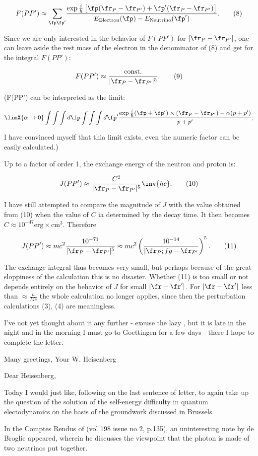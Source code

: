 \documentclass{article}
\newcommand{\nequ}[2]{
\begin{align*}
#1
\tag{#2}
\end{align*}
}
\newcommand{\uequ}[1]{
\begin{align*}
#1
\end{align*}
}
\newcommand{\sumX}[1]{\underset{#1}{\sum}}
\begin{document}
\nequ{
F(P P') \approx \sumX{\fp \fp'}\frac
{
  \exp{
    \frac{i}{\hbar}
    \left[
      \fp(\fr_P - \fr_{P'}) + \fp'(\fr_P - \fr_{P'})
    \right]
  }
}
{
  E_\text{Electron}(\fp) - E_\text{Neutrino}(\fp')
}.
}{8}
Since we are only interested in the behavior of $F(PP')$ for $|\fr_P - \fr_{P'}|$, one can leave aside the rest mass of the electron in the denominator of (8) and get for the integral $F(PP')$:
\nequ{
F(PP') \approx \frac{\text{const.}}{|\fr_P - \fr_{P'}|^5}.
}{9}
(F(PP') can be interpreted as the limit:
\uequ{
\limX{\alpha\to 0}\int\int\int{d\fp}\int\int\int{d\fp'}\frac{
\exp{\frac{i}{\hbar}(\fp + \fp')\times(\fr_P - \fr_{P'}) - \alpha(p + p')}
}{p + p'};
}
I have convinced myself that thia limit exists, even the numeric factor can be easily calculated.)

Up to a factor of order 1, the exchange energy of the neutron and proton is:
\nequ{
J(PP') \approx \frac{C^2}{|\fr_P - \fr_{P'}|^5}\inv{hc}.
}{10}
I have still attempted to compare the magnitude of $J$ with the value obtained from (10) when the value of $C$ ia determined by the decay time. It then becomes $C \approx 10^{-47}\text{erg}\times\text{cm}^3$. Therefore
\nequ{
J(PP') \approx mc^2 \frac{10^{-71}}{|\fr_P - \fr_{P'}|^5}
       \approx mc^2 \left(\frac{10^{-14}}{|\fr_P ;fg - \fr_{P'}}\right)^5.
}{11}
The exchange integral thus becomes very small, but perhaps because of the great sloppiness of the calculation this is no disaster. Whether (11) is too small or not depends entirely on the behavior of $J$ for small $|\fr - \fr'|$. For $|\fr - \fr'|$ less than $\approx \frac{h}{Mc}$ the whole calculation no longer applies, since then the perturbation calculations (3), (4) are meaningless.

I've not yet thought about it any further - excuse the lazy , but it is late in the  night and in the morning I must go to Goettingen for a few days - there I hope to complete the letter.

Many greetings,
Your W. Heisenberg

\date{January 19, 1934}

Dear Heisenberg,

Today I would just like, following on the last sentence of letter, to again take up the question of the solution of the self-energy difficulty in quantum electodynamics on the basis of the groundwork discussed in Brussels.

In the Comptes Rendus of  (vol 198 issue no 2, p.135), an uninteresting note by de Broglie appeared, wherein he discusses the viewpoint that the photon is made of two neutrinos put together.
\end{document}
